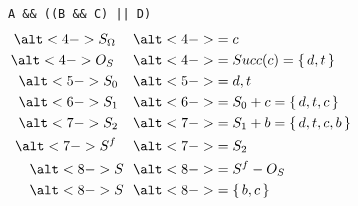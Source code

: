 \documentclass[xcolor = {dvipsnames, table}, aspectratio=169]{beamer}
\newcommand{\disponslide}[2]{%
    \alt<#1>{#2}{\phantom{#2}}
}
\begin{document}
\begin{frame}[fragile]
    \begin{columns}
        \begin{column}{0.6\textwidth}
            \centering
            \lstinline{A && ((B && C) || D)}
            \begin{align*}
                \disponslide{4-}{S_\Omega} & \disponslide{4-}{= c} \\
                \disponslide{4-}{O_S} & \disponslide{4-}{= Succ(c) = \set{d, t}}  \\
                \disponslide{5-}{S_0} & \disponslide{5-}{= d, t} \\
                \disponslide{6-}{S_1} & \disponslide{6-}{= S_0 + c = \set{d, t, c}} \\
                \disponslide{7-}{S_2} & \disponslide{7-}{= S_1 + b = \set{d, t, c, b}} \\
                \disponslide{7-}{S^f} & \disponslide{7-}{= S_2} \\
                \disponslide{8-}{S}   & \disponslide{8-}{= S^f - O_S} \\
                \disponslide{8-}{S}   & \disponslide{8-}{=\set{b, c}} \\
            \end{align*}
        \end{column}

        \begin{column}{0.4\textwidth}
        \end{column}
    \end{columns}
\end{frame}
\end{document}
